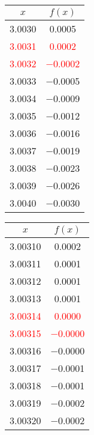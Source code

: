 \documentclass{article}
\begin{document}
\begin{enumerate}
\begin{enumerate}
\begin{tabular}{|c|c|}
                \hline
                \end{tabular}\quad
                \begin{tabular}{|c|c|}
                \hline
                $x$   & $f(x)$ \\
                \hline
                \num{3,0030} & \num{0,0005} \\
                \textcolor{red}{\num{3,0031}} & \textcolor{red}{\num{0,0002}} \\
                \textcolor{red}{\num{3,0032}} & \textcolor{red}{\num{-0,0002}} \\
                \num{3,0033} & \num{-0,0005} \\
                \num{3,0034} & \num{-0,0009} \\
                \num{3,0035} & \num{-0,0012} \\
                \num{3,0036} & \num{-0,0016} \\
                \num{3,0037} & \num{-0,0019} \\
                \num{3,0038} & \num{-0,0023} \\
                \num{3,0039} & \num{-0,0026} \\
                \num{3,0040} & \num{-0,0030} \\
                \hline
                \end{tabular}\quad
                \begin{tabular}{|c|c|}
                \hline
                $x$   & $f(x)$ \\
                \hline
                \num{3,00310} & \num{0,0002} \\
                \num{3,00311} & \num{0,0001} \\
                \num{3,00312} & \num{0,0001} \\
                \num{3,00313} & \num{0,0001} \\
                \textcolor{red}{\num{3,00314}} & \textcolor{red}{\num{0,0000}} \\
                \textcolor{red}{\num{3,00315}} & \textcolor{red}{\num{-0,0000}} \\
                \num{3,00316} & \num{-0,0000} \\
                \num{3,00317} & \num{-0,0001} \\
                \num{3,00318} & \num{-0,0001} \\
                \num{3,00319} & \num{-0,0002} \\
                \num{3,00320} & \num{-0,0002} \\
                \hline
                \end{tabular}\quad \\                   
    

\end{enumerate}
\end{enumerate}
\end{document}
